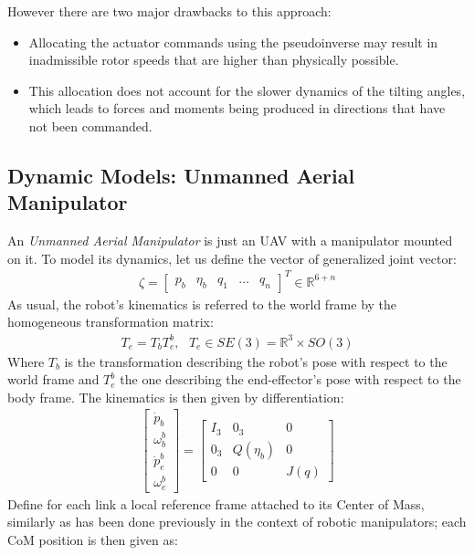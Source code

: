 However there are two major drawbacks to this approach:
\begin{itemize}
    \item Allocating the actuator commands using the pseudoinverse may result in inadmissible rotor speeds that are higher than physically possible.
    \item This allocation does not account for the slower dynamics of the tilting angles, which leads to forces and moments being produced in directions that have not been commanded.
\end{itemize}
\subsection{Dynamic Models: Unmanned Aerial Manipulator}
An \textit{Unmanned Aerial Manipulator} is just an UAV with a manipulator mounted on it. To model its dynamics, let us define the vector of generalized joint vector:
\begin{gather*}
    \zeta=\begin{bmatrix}
        p_{b} & \eta_{b} & q_{1} & \dots & q_{n}
    \end{bmatrix}^{T}\in\mathbb{R}^{6+n}
\end{gather*}
As usual, the robot's kinematics is referred to the world frame by the homogeneous transformation matrix:
\begin{gather*}
    T_{e}=T_{b}T_{e}^{b}, \text{  }T_{e}\in SE(3)=\mathbb{R}^{3}\times SO(3)
\end{gather*}
Where $T_{b}$ is the transformation describing the robot's pose with respect to the world frame and $T_{e}^{b}$ the one describing the end-effector's pose with respect to the body frame. The kinematics is then given by differentiation:
\begin{gather*}
    \begin{bmatrix}
        \dot{p}_{b} \\ \omega_{b}^{b} \\ \dot{p}_{e}^{b} \\ \omega_{e}^{b}
    \end{bmatrix}=
    \begin{bmatrix}
        I_{3} & 0_{3} & 0\\
        0_{3} & Q(\eta_{b}) & 0\\
        0 & 0 & J(q)
    \end{bmatrix}
\end{gather*}
Define for each link a local reference frame attached to its Center of Mass, similarly as has been done previously in the context of robotic manipulators; each CoM position is then given as:
